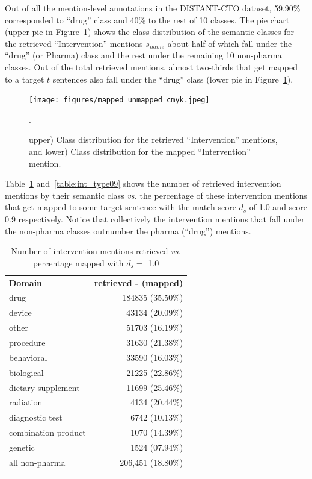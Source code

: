 \documentclass[11pt]{article}
\begin{document}
Out of all the mention-level annotations in the DISTANT-CTO dataset, 59.90\% corresponded to ``drug'' class and 40\% to the rest of 10 classes.
The pie chart (upper pie in Figure~\ref{app:classdist}) shows the class distribution of the semantic classes for the retrieved ``Intervention'' mentions $s_{name}$ about half of which fall under the ``drug'' (or Pharma) class and the rest under the remaining 10 non-pharma classes.
Out of the total retrieved mentions, almost two-thirds that get mapped to a target $t$ sentences also fall under the ``drug'' class (lower pie in Figure~\ref{app:classdist}).
%
\begin{figure}[ht]
\centering
\texttt{[image: figures/mapped\_unmapped\_cmyk.jpeg]}
\caption{upper) Class distribution for the retrieved ``Intervention'' mentions, and lower) Class distribution for the mapped ``Intervention'' mention.}.
\label{app:classdist}
\end{figure}
%
%
%
Table~\ref{table:int_type10} and~\ref{table:int_type09} shows the number of retrieved intervention mentions by their semantic class \textit{vs.} the percentage of these intervention mentions that get mapped to some target sentence with the match score $d_s$ of 1.0 and score 0.9 respectively.
Notice that collectively the intervention mentions that fall under the non-pharma classes outnumber the pharma (``drug'') mentions.
%
\begin{table}[!htbp]
\centering
\begin{tabular}{lr}
\Xhline{1pt} \textbf{Domain} & \textbf{ retrieved - (mapped)  } \\ \Xhline{1pt}
drug & 184835 (35.50\%) \\
device & 43134 (20.09\%) \\
other & 51703 (16.19\%) \\
procedure & 31630 (21.38\%) \\
behavioral & 33590 (16.03\%) \\
biological & 21225 (22.86\%) \\
dietary supplement & 11699 (25.46\%) \\
radiation & 4134 (20.44\%) \\
diagnostic test & 6742 (10.13\%) \\
combination product & 1070 (14.39\%) \\
genetic & 1524 (07.94\%) \\
all non-pharma & 206,451 (18.80\%)\\
\Xhline{1pt}
\end{tabular}
\caption{Number of intervention mentions retrieved \textit{vs.} percentage mapped with $d_s =$ 1.0}
\label{table:int_type10} 
\end{table}
\end{document}
